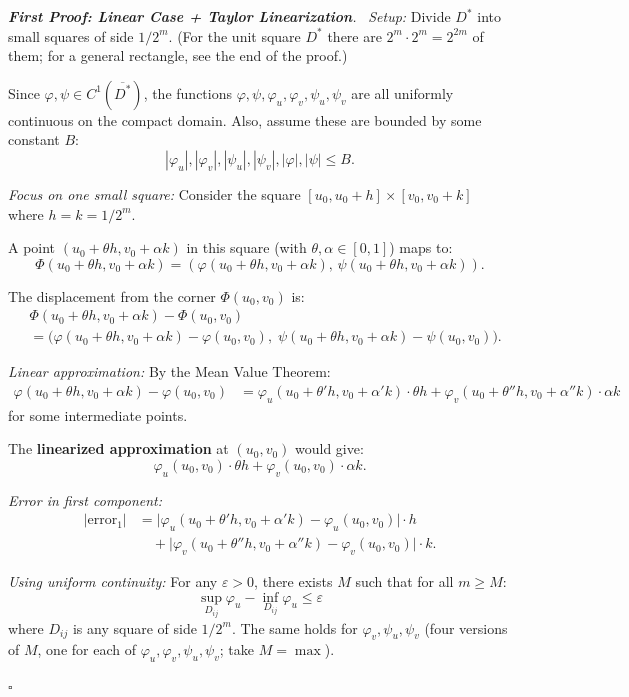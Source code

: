\documentclass[11pt]{report}
\renewenvironment{proof}[1][Proof]{\par\noindent\textit{#1.}\ }{\hfill$\square$\par\medskip}
\begin{document}
\begin{proof}[\textbf{First Proof: Linear Case + Taylor Linearization}]
\textit{Setup:} Divide $D^*$ into small squares of side $1/2^m$. (For the unit square $D^*$ there are $2^m \cdot 2^m = 2^{2m}$ of them; for a general rectangle, see the end of the proof.)

Since $\varphi, \psi \in C^1(\overline{D^*})$, the functions $\varphi, \psi, \varphi_u, \varphi_v, \psi_u, \psi_v$ are all uniformly continuous on the compact domain. Also, assume these are bounded by some constant $B$:
\[
|\varphi_u|, |\varphi_v|, |\psi_u|, |\psi_v|, |\varphi|, |\psi| \leq B.
\]

\textit{Focus on one small square:} Consider the square $[u_0, u_0 + h] \times [v_0, v_0 + k]$ where $h = k = 1/2^m$.

A point $(u_0 + \theta h, v_0 + \alpha k)$ in this square (with $\theta, \alpha \in [0,1]$) maps to:
\[
\Phi(u_0 + \theta h, v_0 + \alpha k) = (\varphi(u_0 + \theta h, v_0 + \alpha k), \, \psi(u_0 + \theta h, v_0 + \alpha k)).
\]

The displacement from the corner $\Phi(u_0, v_0)$ is:
\begin{align*}
&\Phi(u_0 + \theta h, v_0 + \alpha k) - \Phi(u_0, v_0) \\
&= \big( \varphi(u_0 + \theta h, v_0 + \alpha k) - \varphi(u_0, v_0), \; \psi(u_0 + \theta h, v_0 + \alpha k) - \psi(u_0, v_0) \big).
\end{align*}

\textit{Linear approximation:} By the Mean Value Theorem:
\begin{align*}
\varphi(u_0 + \theta h, v_0 + \alpha k) - \varphi(u_0, v_0) &= \varphi_u(u_0 + \theta' h, v_0 + \alpha' k) \cdot \theta h + \varphi_v(u_0 + \theta'' h, v_0 + \alpha'' k) \cdot \alpha k
\end{align*}
for some intermediate points.

The \textbf{linearized approximation} at $(u_0, v_0)$ would give:
\[
\varphi_u(u_0, v_0) \cdot \theta h + \varphi_v(u_0, v_0) \cdot \alpha k.
\]

\textit{Error in first component:}
\begin{align*}
|\text{error}_1| &= \big| \varphi_u(u_0 + \theta' h, v_0 + \alpha' k) - \varphi_u(u_0, v_0) \big| \cdot h \\
&\quad + \big| \varphi_v(u_0 + \theta'' h, v_0 + \alpha'' k) - \varphi_v(u_0, v_0) \big| \cdot k.
\end{align*}

\textit{Using uniform continuity:} For any $\varepsilon > 0$, there exists $M$ such that for all $m \geq M$:
\[
\sup_{D_{ij}} \varphi_u - \inf_{D_{ij}} \varphi_u \leq \varepsilon
\]
where $D_{ij}$ is any square of side $1/2^m$. The same holds for $\varphi_v, \psi_u, \psi_v$ (four versions of $M$, one for each of $\varphi_u, \varphi_v, \psi_u, \psi_v$; take $M = \max$).


\end{proof}
\end{document}
